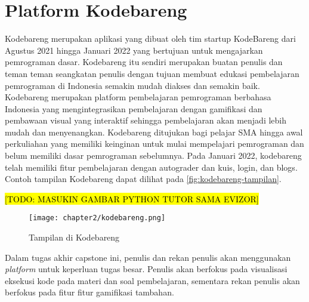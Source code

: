 \section{Platform Kodebareng}

Kodebareng merupakan aplikasi yang dibuat oleh tim startup KodeBareng dari Agustus 2021 hingga Januari 2022 yang bertujuan untuk mengajarkan pemrograman dasar. Kodebareng itu sendiri merupakan buatan penulis dan teman teman seangkatan penulis dengan tujuan membuat edukasi pembelajaran pemrograman di Indonesia semakin mudah diakses dan semakin baik. Kodebareng merupakan platform pembelajaran pemrograman berbahasa Indonesia yang mengintegrasikan pembelajaran dengan gamifikasi dan pembawaan visual yang interaktif sehingga pembelajaran akan menjadi lebih mudah dan menyenangkan. Kodebareng ditujukan bagi pelajar SMA hingga awal perkuliahan yang memiliki keinginan untuk mulai mempelajari pemrograman dan belum memiliki dasar pemrograman sebelumnya. Pada Januari 2022, kodebareng telah memiliki fitur pembelajaran dengan autograder dan kuis, login, dan blogs. Contoh tampilan Kodebareng dapat dilihat pada \autoref{fig:kodebareng-tampilan}.

\hl{[TODO: MASUKIN GAMBAR PYTHON TUTOR SAMA EVIZOR]}

\begin{figure}[h]
  \centering
  \texttt{[image: chapter2/kodebareng.png]}
  \caption{Tampilan di Kodebareng}\label{fig:kodebareng-tampilan}
\end{figure}

Dalam tugas akhir capstone ini, penulis dan rekan penulis akan menggunakan \textit{platform} untuk keperluan tugas besar. Penulis akan berfokus pada visualisasi eksekusi kode pada materi dan soal pembelajaran, sementara rekan penulis akan berfokus pada fitur fitur gamifikasi tambahan.